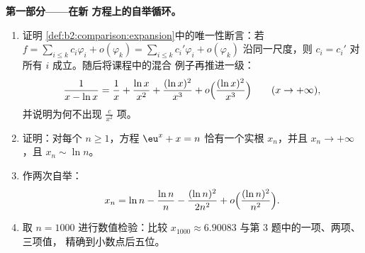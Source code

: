 \begin{problem}
\label{pb:b2:comparison:1}

\medskip
\noindent\textbf{第一部分——在新
方程上的自举循环。}
\begin{enumerate}
  \item 证明
        \cref{def:b2:comparison:expansion}中的唯一性断言：若 $f = \sum_{i\leq
        k} c_i\varphi_i + o(\varphi_k) = \sum_{i \leq k}
        c_i'\varphi_i + o(\varphi_k)$ 沿同一尺度，则
        $c_i = c_i'$ 对所有 $i$ 成立。随后将课程中的混合
        例子再推进一级：
        \[
        \frac{1}{x - \ln x} = \frac1x + \frac{\ln x}{x^2} +
        \frac{(\ln x)^2}{x^3} + o\Bigl(\frac{(\ln
        x)^2}{x^3}\Bigr) \qquad (x \to +\infty),
        \]
        并说明为何不出现 $\frac{c}{x^2}$ 项。
  \item 证明：对每个 $n \geq 1$，方程 $\eu^x + x =
        n$ 恰有一个实根 $x_n$，并且 $x_n
        \to +\infty$，且 $x_n \sim \ln n$。
  \item 作两次自举：
        \[
        x_n = \ln n - \frac{\ln n}{n} - \frac{(\ln n)^2}{2n^2} +
        o\Bigl(\frac{(\ln n)^2}{n^2}\Bigr).
        \]
  \item 取 $n = 1000$ 进行数值检验：比较 $x_{1000}
        \approx 6.90083$ 与第 3 题中的一项、两项、三项值，
        精确到小数点后五位。
\end{enumerate}


\end{problem}
